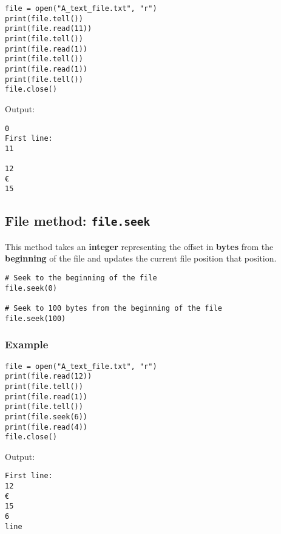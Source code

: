 \documentclass[11pt]{article}
\begin{document}
\begin{verbatim}
file = open("A_text_file.txt", "r")
print(file.tell())
print(file.read(11))
print(file.tell())
print(file.read(1))
print(file.tell())
print(file.read(1))
print(file.tell())
file.close()
\end{verbatim}

 \noindent Output:

\begin{verbatim}
0
First line:
11
 
12
€
15
\end{verbatim}

\subsection{File method: \texttt{file.seek}}
\label{sec:org1cf3f95}
This method takes an \textbf{integer} representing the offset in \textbf{bytes} from the \textbf{beginning} of the file and updates the current file position that position.
\begin{verbatim}
# Seek to the beginning of the file
file.seek(0)

# Seek to 100 bytes from the beginning of the file
file.seek(100)
\end{verbatim}

\subsubsection{Example}
\label{sec:org8979809}
\begin{verbatim}
file = open("A_text_file.txt", "r")
print(file.read(12))
print(file.tell())
print(file.read(1))
print(file.tell())
print(file.seek(6))
print(file.read(4))
file.close()
\end{verbatim}

 \noindent Output:

\begin{verbatim}
First line: 
12
€
15
6
line
\end{verbatim}


 \newpage
\end{document}
